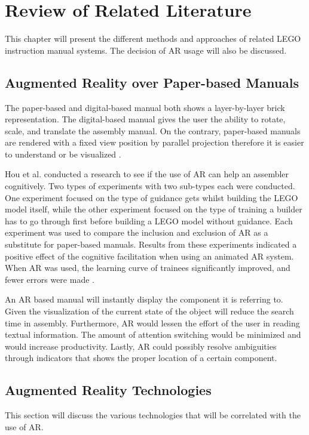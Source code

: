 \chapter{Review of Related Literature}
\label{sec:relatedlit}

This chapter will present the different methods and approaches of related LEGO instruction manual systems. The decision of AR usage will also be discussed.

\section{Augmented Reality over Paper-based Manuals}
The paper-based and digital-based manual both shows a layer-by-layer brick representation. The digital-based manual gives the user the ability to rotate, scale, and translate the assembly manual. On the contrary, paper-based manuals are rendered with a fixed view position by parallel projection therefore it is easier to understand or be visualized \cite{Tseng:2012:BEM:2307096.2307119}.

Hou et al. conducted a research to see if the use of AR can help an assembler cognitively. Two types of experiments with two sub-types each were conducted. One experiment focused on the type of guidance gets whilst building the LEGO model itself, while the other experiment focused on the type of training a builder has to go through first before building a LEGO model without guidance. Each experiment was used to compare the inclusion and exclusion of AR as a substitute for paper-based manuals. Results from these experiments indicated a positive effect of the cognitive facilitation when using an animated AR system. When AR was used, the learning curve of trainees significantly improved, and fewer errors were made \cite{HouWangBernold2013}.
    
    An AR based manual will instantly display the component it is referring to. Given the visualization of the current state of the object will reduce the search time in assembly. Furthermore, AR would lessen the effort of the user in reading textual information. The amount of attention switching would be minimized and would increase productivity. Lastly, AR could possibly resolve ambiguities through indicators that shows the proper location of a certain component\cite{AR-Context}.

\section{Augmented Reality Technologies}
This section will discuss the various technologies that will be correlated with the use of AR. 
